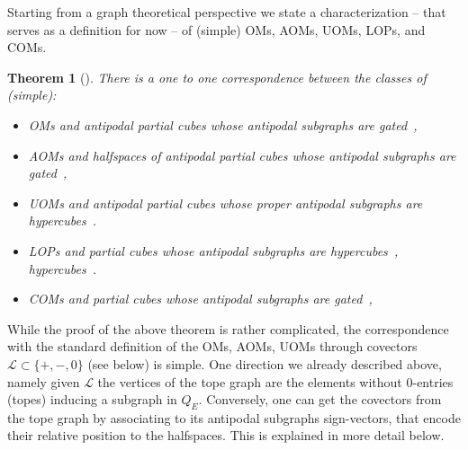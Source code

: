 \documentclass[final,11pt]{article}
\newtheorem{thm}{Theorem}[section]
\begin{document}
Starting from a graph theoretical perspective we state a characterization -- that serves as a definition for now -- of (simple)  OMs, AOMs, UOMs, LOPs, and COMs.

\begin{thm}[\cite{CKP22,daS-95,Kna-17}]\label{thm:char}
 There is a one to one correspondence between the classes of (simple):
 \begin{itemize}
  \item[(i)]   OMs and antipodal partial cubes whose antipodal subgraphs are gated~\cite{Kna-17,daS-95},
  \item[(ii)]  AOMs and halfspaces of antipodal partial cubes whose antipodal subgraphs are gated~\cite{Kna-17},
  \item[(iii)] UOMs and antipodal partial cubes whose proper antipodal subgraphs are  hypercubes~\cite{Kna-17,CKP22}.
\item[(iv)]  LOPs and partial cubes whose antipodal subgraphs are  hypercubes~\cite{Law-83},
 hypercubes~\cite{Kna-17,CKP22}.

\item[(v)]  COMs and partial cubes whose antipodal subgraphs are gated~\cite{Kna-17},
 
 \end{itemize}
\end{thm}


While the proof of the above theorem is rather complicated, the correspondence with the standard definition of the OMs, AOMs, UOMs through covectors $\mathcal{L} \subset \{+,-,0\}$ (see below) is simple. One direction we already described above, namely given $\mathcal{L}$ the vertices of the tope graph are the elements without $0$-entries (topes) inducing a subgraph in $Q_{E}$. Conversely, one can get the covectors from the tope graph by associating to its antipodal subgraphs sign-vectors, that encode their relative position to the halfspaces. This is explained in more detail below.
\end{document}
